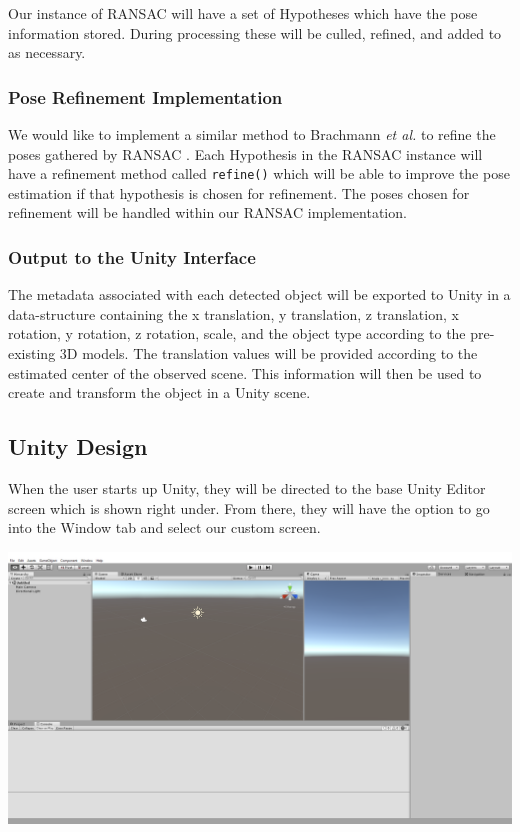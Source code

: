 \documentclass[12pt]{article}
\let\origfigure=\figure
\let\endorigfigure=\endfigure
\renewenvironment{figure}[1][]{%
  \origfigure[H]
}{%
  \endorigfigure
}
\begin{document}
Our instance of RANSAC will have a set of Hypotheses which have the pose
information stored. During processing these will be culled, refined, and
added to as necessary.

\subsubsection{Pose Refinement
Implementation}\label{pose-refinement-implementation}

We would like to implement a similar method to Brachmann \emph{et al.}
to refine the poses gathered by RANSAC \autocite{brachmann}. Each
Hypothesis in the RANSAC instance will have a refinement method called
\texttt{refine()} which will be able to improve the pose estimation if
that hypothesis is chosen for refinement. The poses chosen for
refinement will be handled within our RANSAC implementation.

\subsubsection{Output to the Unity
Interface}\label{output-to-the-unity-interface}

The metadata associated with each detected object will be exported to
Unity in a data-structure containing the x translation, y translation, z
translation, x rotation, y rotation, z rotation, scale, and the object
type according to the pre-existing 3D models. The translation values
will be provided according to the estimated center of the observed
scene. This information will then be used to create and transform the
object in a Unity scene.

\subsection{Unity Design}\label{unity-design}

When the user starts up Unity, they will be directed to the base Unity
Editor screen which is shown right under. From there, they will have the
option to go into the Window tab and select our custom screen.

\begin{figure}
\centering
\includegraphics{Pictures/UnityHomeScreen.png}
\caption{Unity Editor Home Screen}
\end{figure}
\end{document}

